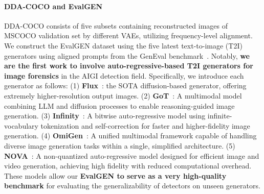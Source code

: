 \documentclass{article}
\begin{document}
\paragraph{DDA-COCO and EvalGEN} DDA-COCO consists of five subsets containing reconstructed images of MSCOCO \cite{coco} validation set by different VAEs, utilizing frequency-level alignment.
We construct the EvalGEN dataset using the five latest text-to-image (T2I) generators using aligned prompts from the GenEval benchmark~\cite{ghosh2023geneval}. Notably, \textbf{we are the first work to involve auto-regressive-based T2I generators for image forensics} in the AIGI detection field.
Specifically, we introduce each generator as follows: (1) \textbf{Flux}~\cite{flux2024}: the SOTA diffusion-based generator, offering extremely higher-resolution output images. (2) \textbf{GoT}~\cite{fang2025got}: A multimodal model combining LLM and diffusion processes to enable reasoning-guided image generation. (3) \textbf{Infinity}~\cite{han2024infinity}: A bitwise auto-regressive model using infinite-vocabulary tokenization and self-correction for faster and higher-fidelity image generation. (4) \textbf{OmiGen}~\cite{xiao2024omnigen}: A unified multimodal framework capable of handling diverse image generation tasks within a single, simplified architecture. (5) \textbf{NOVA}~\cite{nova}: A non-quantized auto-regressive model designed for efficient image and video generation, achieving high fidelity with reduced computational overhead. 
These models allow our \textbf{EvalGEN to serve as a very high-quality benchmark} for evaluating the generalizability of detectors on unseen generators.
\end{document}
